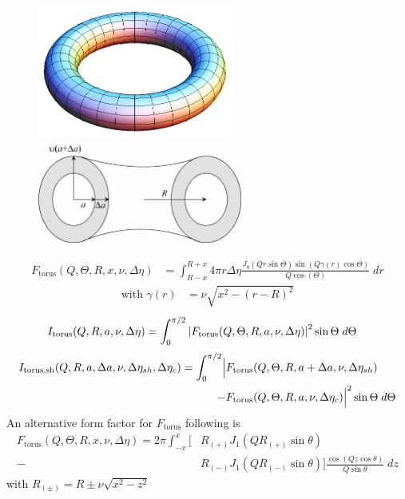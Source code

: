 \begin{figure}[htb]
\begin{center}
\includegraphics[width=0.575\textwidth,height=0.5\textwidth]{torus.png}
\end{center}
\begin{center}
\includegraphics[width=0.6\textwidth,height=0.3\textwidth]{torus_sh_xsect.png}
\end{center}
\caption{} \label{torus}
\end{figure}
\begin{align}
F_\text{torus}(Q,\Theta,R,x,\nu,\Delta\eta) & = \int_{R-x}^{R+x}
4\pi r \Delta\eta \frac{J_0(Qr\sin\Theta) \sin(
Q\gamma(r)\cos\Theta)}{Q\cos(\Theta)} \; dr
\end{align}
\begin{align}
\text{with } \gamma(r) &= \nu \sqrt{x^2-(r-R)^2}
\end{align}
\begin{align}
I_\text{torus}(Q,R,a,\nu,\Delta\eta) &= \int_0^{\pi/2}
\abs{F_\text{torus}(Q,\Theta,R,a,\nu,\Delta\eta)}^2 \sin\Theta  \;
d\Theta
\end{align}
\begin{align}
I_\text{torus,sh}(Q,R,a,\Delta a,\nu,\Delta\eta_{sh},\Delta\eta_c)
= \int_0^{\pi/2} \Bigl\lvert & F_\text{torus}(Q,\Theta,R,a+\Delta
a,\nu,\Delta\eta_{sh}) \\
-&F_\text{torus}(Q,\Theta,R,a,\nu,\Delta\eta_c)\Bigr\rvert^2
\sin\Theta  \;  d\Theta \nonumber
\end{align}
An alternative form factor for $F_\text{torus}$ following \cite{Forster1999} is
\begin{align}
F_\text{torus}(Q,\Theta,R,x,\nu,\Delta\eta)  = 2\pi\int_{-x}^{x}
\bigg[
 & R_{(+)} J_1(QR_{(+)}\sin\theta) \\
-& R_{(-)} J_1(QR_{(-)}\sin\theta) \bigg]
\frac{\cos(Qz\cos\theta)}{Q\sin\theta} \; dz \nonumber
\end{align}
with $R_{(\pm)} = R\pm\nu\sqrt{x^2-z^2}$

